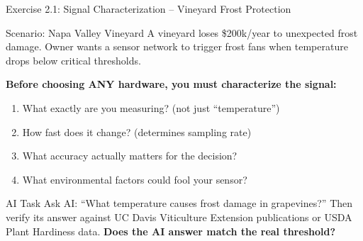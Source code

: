 \documentclass[aspectratio=169,11pt]{beamer}
\begin{document}
\begin{frame}{Exercise 2.1: Signal Characterization -- Vineyard Frost Protection}
    \begin{block}{Scenario: Napa Valley Vineyard}
        A vineyard loses \$200k/year to unexpected frost damage. Owner wants a sensor network to trigger frost fans when temperature drops below critical thresholds.
        
        \vspace{0.2cm}
        \textbf{Before choosing ANY hardware, you must characterize the signal:}
        \begin{enumerate}
            \item What exactly are you measuring? (not just ``temperature'')
            \item How fast does it change? (determines sampling rate)
            \item What accuracy actually matters for the decision?
            \item What environmental factors could fool your sensor?
        \end{enumerate}
    \end{block}
    
    \vspace{0.1cm}
    \begin{alertblock}{AI Task}
        Ask AI: ``What temperature causes frost damage in grapevines?'' Then verify its answer against UC Davis Viticulture Extension publications or USDA Plant Hardiness data. \textbf{Does the AI answer match the real threshold?}
    \end{alertblock}
\end{frame}
\end{document}
